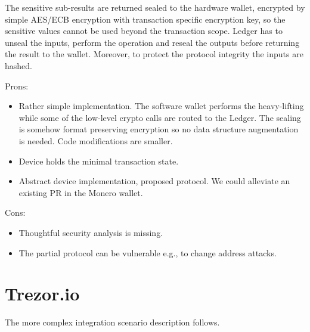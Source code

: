 \documentclass[]{article}
\begin{document}
The sensitive sub-results are returned sealed to the hardware wallet, encrypted by simple AES/ECB encryption with transaction specific encryption key, so the sensitive values cannot be used beyond the transaction scope. Ledger has to unseal the inputs, perform the operation and reseal the outputs before returning the result to the wallet. Moreover, to protect the protocol integrity the inputs are hashed. 

\;
\noindent Prons:
\begin{itemize}
	\item Rather simple implementation. The software wallet performs the heavy-lifting while some of the 
	low-level crypto calls are routed to the Ledger. The sealing is somehow format preserving encryption so no data structure augmentation is needed. Code modifications are smaller.
	\item Device holds the minimal transaction state.
	\item Abstract device implementation, proposed protocol. We could alleviate an existing PR\cite{ledger_pr} in the Monero wallet.
\end{itemize}

\noindent Cons:
\begin{itemize}
	\item Thoughtful security analysis is missing. 
	\item The partial protocol can be vulnerable e.g., to change address attacks.
\end{itemize}

\noindent 

\section{Trezor.io}

The more complex integration scenario description follows.


{}

	
\end{document}
